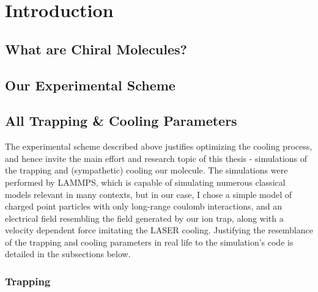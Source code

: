 \chapter{Introduction}



\section{What are Chiral Molecules?}

\section{Our Experimental Scheme}


\section{All Trapping \& Cooling Parameters}

The experimental scheme described above justifies optimizing the cooling process, and hence invite the main effort and research topic of this thesis - simulations of the trapping and (sympathetic) cooling our molecule. The simulations were performed by LAMMPS\cite{LAMMPS}, which is capable of simulating numerous classical models relevant in many contexts, but in our case, I chose a simple model of charged point particles with only long-range coulomb interactions, and an electrical field resembling the field generated by our ion trap, along with a velocity dependent force imitating the LASER cooling. Justifying the resemblance of the trapping and cooling parameters in real life to the simulation's code is detailed in the subsections below.

\subsection{Trapping}\label{ssec:params-trapping}


